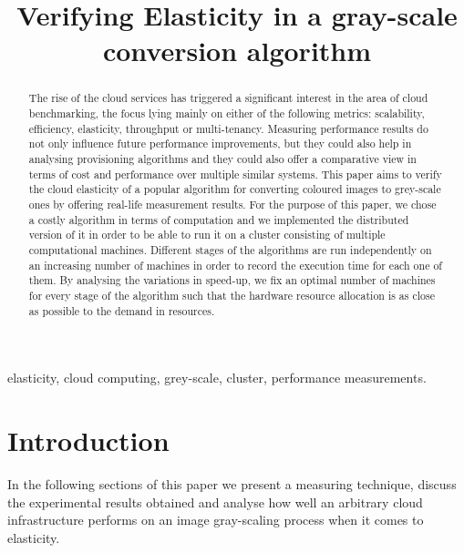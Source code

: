 \documentclass[conference]{IEEEtran}
\begin{document}
\title{Verifying Elasticity in a gray-scale conversion algorithm}


\author{
}

\maketitle


\begin{abstract}
The rise of the cloud services has triggered a significant interest in the area of cloud benchmarking, the focus lying mainly on either of the following metrics: scalability, efficiency, elasticity, throughput or multi-tenancy. Measuring performance results do not only influence future performance improvements, but they could also help in analysing provisioning algorithms and they could also offer a comparative view in terms of cost and performance over multiple similar systems. This paper aims to verify the cloud elasticity of a popular algorithm for converting coloured images to grey-scale ones by offering real-life measurement results. For the purpose of this paper, we chose a costly algorithm in terms of computation and we implemented the distributed version of it in order to be able to run it on a cluster consisting of multiple computational machines. Different stages of the algorithms are run independently on an increasing number of machines in order to record the execution time for each one of them. By analysing the variations in speed-up, we fix an optimal number of machines for every stage of the algorithm such that the hardware resource allocation is as close as possible to the demand in resources. 

\end{abstract}

\begin{IEEEkeywords}
elasticity, cloud computing, grey-scale, cluster, performance measurements.
\end{IEEEkeywords}

\IEEEpeerreviewmaketitle


\section{Introduction}
In the following sections of this paper we present a measuring technique, discuss the experimental results obtained and analyse how well an arbitrary cloud infrastructure performs on an image gray-scaling process when it comes to elasticity.\\
\end{document}
